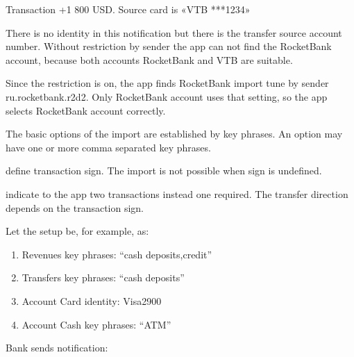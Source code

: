 \documentclass[a4paper,10pt,english]{sphinxmanual}
\begin{document}
\begin{sphinxVerbatim}[commandchars=\\\{\}]
Transaction \PYGZgt{}\PYGZgt{} +1 800 USD.
Source card is «VTB ***1234»
\end{sphinxVerbatim}

There is no identity in this notification but there is the transfer source account number. Without
restriction by sender the app can not find the RocketBank account, because both accounts
RocketBank and VTB are suitable.

Since the restriction is on, the app finds RocketBank import tune by sender ru.rocketbank.r2d2.
Only RocketBank account uses that setting, so the app selects RocketBank account correctly.

The basic options of the import are established by key phrases. An option may have one or more
comma separated key phrases.

 define transaction sign. The import is not possible when
sign is undefined.

 indicate to the app two transactions instead one required.
The transfer direction depends on the transaction sign.

Let the setup be, for example, as:
\begin{enumerate}
\def\theenumi{\arabic{enumi}}
\def\labelenumi{\theenumi .}
\makeatletter\def\p@enumii{\p@enumi \theenumi .}\makeatother
\item {} 
Revenues key phrases: “cash deposits,credit”

\item {} 
Transfers key phrases: “cash deposits”

\item {} 
Account Card identity: Visa2900

\item {} 
Account Cash key phrases: “ATM”

\end{enumerate}

Bank sends notification:

\begin{sphinxVerbatim}[commandchars=\\\{\}]
          
\end{sphinxVerbatim}
\end{document}
